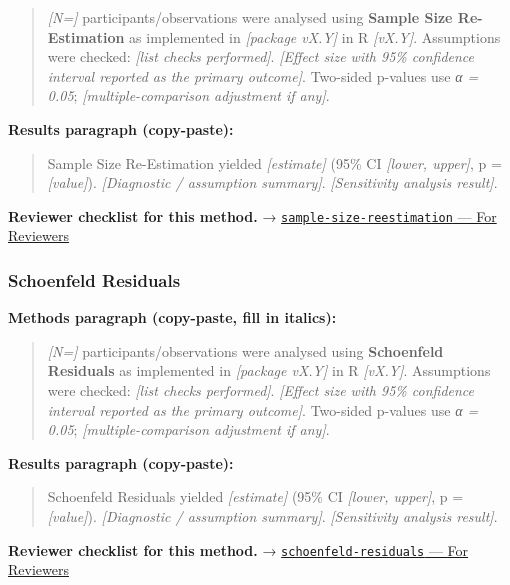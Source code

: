 \documentclass[
]{article}
\begin{document}
\begin{quote}
\emph{{[}N={]}} participants/observations were analysed using
\textbf{Sample Size Re-Estimation} as implemented in \emph{{[}package
vX.Y{]}} in R \emph{{[}vX.Y{]}}. Assumptions were checked: \emph{{[}list
checks performed{]}}. \emph{{[}Effect size with 95\% confidence interval
reported as the primary outcome{]}}. Two-sided p-values use \emph{α =
0.05}; \emph{{[}multiple-comparison adjustment if any{]}}.
\end{quote}

\textbf{Results paragraph (copy-paste):}

\begin{quote}
Sample Size Re-Estimation yielded \emph{{[}estimate{]}} (95\% CI
\emph{{[}lower, upper{]}}, p = \emph{{[}value{]}}). \emph{{[}Diagnostic
/ assumption summary{]}}. \emph{{[}Sensitivity analysis result{]}}.
\end{quote}

\textbf{Reviewer checklist for this method.} →
\href{../chapters/14-clinical/sample-size-reestimation.Rmd\#for-reviewers}{\texttt{sample-size-reestimation}
--- For Reviewers}

\subsubsection{Schoenfeld Residuals}\label{schoenfeld-residuals}

\textbf{Methods paragraph (copy-paste, fill in italics):}

\begin{quote}
\emph{{[}N={]}} participants/observations were analysed using
\textbf{Schoenfeld Residuals} as implemented in \emph{{[}package
vX.Y{]}} in R \emph{{[}vX.Y{]}}. Assumptions were checked: \emph{{[}list
checks performed{]}}. \emph{{[}Effect size with 95\% confidence interval
reported as the primary outcome{]}}. Two-sided p-values use \emph{α =
0.05}; \emph{{[}multiple-comparison adjustment if any{]}}.
\end{quote}

\textbf{Results paragraph (copy-paste):}

\begin{quote}
Schoenfeld Residuals yielded \emph{{[}estimate{]}} (95\% CI
\emph{{[}lower, upper{]}}, p = \emph{{[}value{]}}). \emph{{[}Diagnostic
/ assumption summary{]}}. \emph{{[}Sensitivity analysis result{]}}.
\end{quote}

\textbf{Reviewer checklist for this method.} →
\href{../chapters/11-survival/schoenfeld-residuals.Rmd\#for-reviewers}{\texttt{schoenfeld-residuals}
--- For Reviewers}
\end{document}
